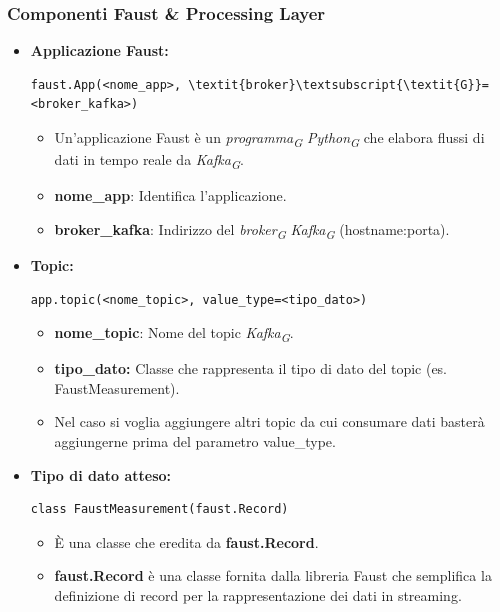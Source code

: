 \subsubsection{Componenti Faust \& Processing Layer}
\begin{itemize}
    \item \textbf{Applicazione Faust:}
    \begin{lstlisting}[style=code]
        faust.App(<nome_app>, \textit{broker}\textsubscript{\textit{G}}=<broker_kafka>)
    \end{lstlisting} 
    \begin{itemize}
        \item Un'applicazione Faust è un \textit{programma}\textsubscript{\textit{G}} \textit{Python}\textsubscript{\textit{G}} che elabora flussi di dati in tempo reale da \textit{Kafka}\textsubscript{\textit{G}}.
        \item \textbf{nome\_app}: Identifica l'applicazione.
        \item \textbf{broker\_kafka}: Indirizzo del \textit{broker}\textsubscript{\textit{G}} \textit{Kafka}\textsubscript{\textit{G}} (hostname:porta).
    \end{itemize}
    \item \textbf{Topic:}
    \begin{lstlisting}[style=code]
        app.topic(<nome_topic>, value_type=<tipo_dato>)
    \end{lstlisting}  
    \begin{itemize}
        \item \textbf{nome\_topic}: Nome del topic \textit{Kafka}\textsubscript{\textit{G}}.
        \item \textbf{tipo\_dato:} Classe che rappresenta il tipo di dato del topic (es. FaustMeasurement).
        \item Nel caso si voglia aggiungere altri topic da cui consumare dati basterà aggiungerne prima del parametro value\_type.
    \end{itemize}
    \item \textbf{Tipo di dato atteso:}
     \begin{lstlisting}[style=code]
        class FaustMeasurement(faust.Record)
    \end{lstlisting}  
    \begin{itemize}
        \item È una classe che eredita da \textbf{faust.Record}.
        \item \textbf{faust.Record} è una classe fornita dalla libreria Faust che semplifica la definizione di record per la rappresentazione dei dati in streaming.

\end{itemize}
\end{itemize}

